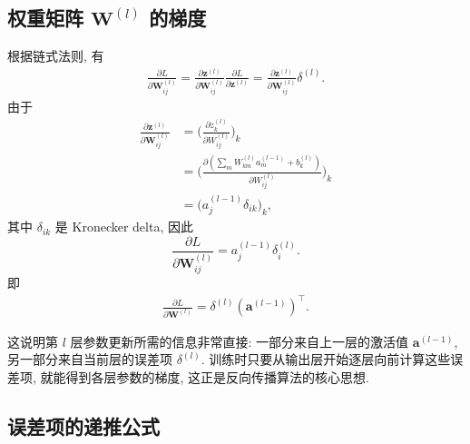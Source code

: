 \documentclass{../nndlcourse}
\begin{document}
\subsection{权重矩阵 $\boldsymbol{W}^{(l)}$ 的梯度}


根据链式法则, 有
\begin{align*}
    \frac{\partial L}{ \partial \boldsymbol{W}^{(l)}_{i j}} 
    =
    \frac{\partial \boldsymbol{z}^{(l)}}{\partial \boldsymbol{W}^{(l)}_{i j}} \frac{\partial L}{\partial \boldsymbol{z}^{(l)}} 
    =
    \frac{\partial \boldsymbol{z}^{(l)}}{\partial \boldsymbol{W}^{(l)}_{i j}}  \delta^{(l)}
    .
\end{align*}
由于
\begin{align*}
     \frac{\partial \boldsymbol{z}^{(l)}}{\partial \boldsymbol{W}^{(l)}_{i j}} 
     & =
     \bigg( \frac{\partial z_k^{(l)}}{\partial W_{ij}^{(l)}} \bigg)_{k}
     \\
    & =
    \bigg( \frac{\partial (\sum_{m} W_{km}^{(l)} a_m^{(l-1)} + b_k^{(l)})}{\partial W_{ij}^{(l)}} \bigg)_{k}
    \\
    & =
    \bigg( a_j^{(l-1)} \delta_{ik} \bigg)_{k}
    ,
\end{align*}
其中 $\delta_{ik}$ 是 Kronecker delta, 因此
\begin{equation*}
    \frac{\partial L}{\partial \boldsymbol{W}^{(l)}_{i j}} = a_j^{(l-1)} \delta_i^{(l)}.    
\end{equation*}
即
\begin{align*}
    \frac{\partial L}{\partial \boldsymbol{W}^{(l)}} 
    = 
    \delta^{(l)} (\boldsymbol{a}^{(l-1)})^\top
    .
\end{align*}

这说明第 $l$ 层参数更新所需的信息非常直接: 一部分来自上一层的激活值 $\boldsymbol{a}^{(l-1)}$, 另一部分来自当前层的误差项 $\delta^{(l)}$. 训练时只要从输出层开始逐层向前计算这些误差项, 就能得到各层参数的梯度, 这正是反向传播算法的核心思想. 

\subsection{误差项的递推公式}
\end{document}
